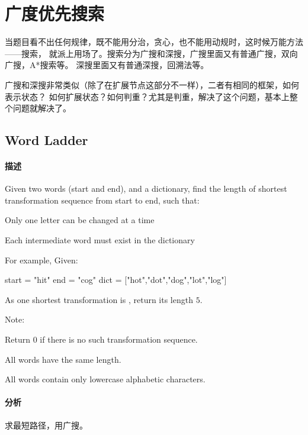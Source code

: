 \chapter{广度优先搜索}
当题目看不出任何规律，既不能用分治，贪心，也不能用动规时，这时候万能方法——搜索，
就派上用场了。搜索分为广搜和深搜，广搜里面又有普通广搜，双向广搜，A*搜索等。
深搜里面又有普通深搜，回溯法等。

广搜和深搜非常类似（除了在扩展节点这部分不一样），二者有相同的框架，如何表示状态？
如何扩展状态？如何判重？尤其是判重，解决了这个问题，基本上整个问题就解决了。


\section{Word Ladder} %
\label{sec:word-ladder}


\subsubsection{描述}
Given two words (start and end), and a dictionary, find the length of shortest transformation sequence from start to end, such that:
\begindot
\item Only one letter can be changed at a time
\item Each intermediate word must exist in the dictionary
\myenddot

For example, Given:

\begin{Code}
start = "hit"
end = "cog"
dict = ["hot","dot","dog","lot","log"]
\end{Code}
As one shortest transformation is , return its length $5$.

Note:
\begindot
\item Return 0 if there is no such transformation sequence.
\item All words have the same length.
\item All words contain only lowercase alphabetic characters.
\myenddot


\subsubsection{分析}
求最短路径，用广搜。


